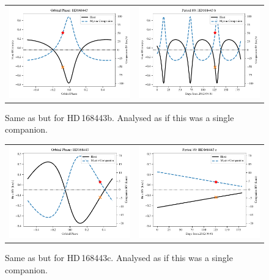 \begin{figure}
    \centering
    \begin{tabular}{cc}
        \includegraphics[width=0.45\linewidth]{figures/direct-recovery/orbital-plots/HD168443b_orbital_phase.pdf}&
        \includegraphics[width=0.45\linewidth]{figures/direct-recovery/orbital-plots/HD168443b_p89.pdf}\\
    \end{tabular}
    \caption{Same as  but for {HD\,168443}b. Analysed as if this was a single companion.}
    \label{fig:hd168443bp89}
\end{figure}


\begin{figure}
    \centering
    \begin{tabular}{cc}
        \includegraphics[width=0.45\linewidth]{figures/direct-recovery/orbital-plots/HD168443c_orbital_phase.pdf}&
        \includegraphics[width=0.45\linewidth]{figures/direct-recovery/orbital-plots/HD168443c_p89.pdf}\\
    \end{tabular}
    \caption{Same as  but for {HD\,168443}c. Analysed as if this was a single companion.}
    \label{fig:hd168443cp89}
\end{figure}

